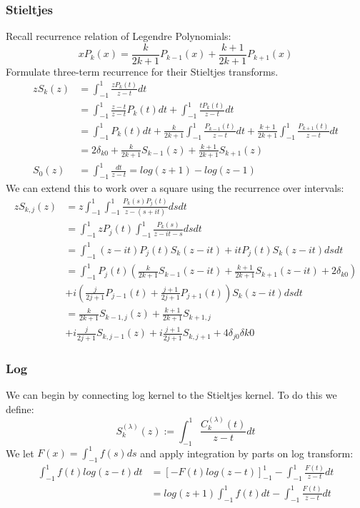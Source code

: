 \documentclass{article}
\begin{document}
\subsubsection*{Stieltjes}
Recall recurrence relation of Legendre Polynomials:
\begin{equation}\label{legendre recurrence}
	xP_k(x) = \frac{k}{2k+1}P_{k-1}(x) + \frac{k+1}{2k+1}P_{k+1}(x)
\end{equation}
Formulate three-term recurrence for their Stieltjes transforms.
\begin{equation}
\begin{split}
	zS_k(z) &= \int_{-1}^{1}\frac{zP_k(t)}{z-t}dt \\
	&= \int_{-1}^{1}\frac{z-t}{z-t}P_k(t)dt+\int_{-1}^{1}\frac{tP_k(t)}{z-t}dt \\
	&= \int_{-1}^{1}P_k(t)dt+\frac{k}{2k+1}\int_{-1}^{1}\frac{P_{k-1}(t)}{z-t}dt+\frac{k+1}{2k+1}\int_{-1}^{1}\frac{P_{k+1}(t)}{z-t}dt \\
	&= 2\delta_{k0}+\frac{k}{2k+1}S_{k-1}(z)+\frac{k+1}{2k+1}S_{k+1}(z) \\
	S_0(z) &= \int_{-1}^{1}\frac{dt}{z-t} = log(z+1)-log(z-1)
\end{split}
\end{equation}
We can extend this to work over a square using the recurrence over intervals:
\begin{equation}
\begin{split}
zS_{k,j}(z) &= z\int_{-1}^1\int_{-1}^1\frac{P_k(s)P_j(t)}{z-(s+it)}dsdt \\
&= \int_{-1}^1zP_j(t)\int_{-1}^1\frac{P_k(s)}{z-it-s}dsdt \\
&= \int_{-1}^1(z-it)P_j(t)S_k(z-it)+itP_j(t)S_k(z-it)dsdt \\
&= \int_{-1}^1P_j(t)(\frac{k}{2k+1}S_{k-1}(z-it)+\frac{k+1}{2k+1}S_{k+1}(z-it)+2\delta_{k0}) \\
&+i(\frac{j}{2j+1}P_{j-1}(t)+\frac{j+1}{2j+1}P_{j+1}(t))S_k(z-it)dsdt \\
&= \frac{k}{2k+1}S_{k-1,j}(z)+\frac{k+1}{2k+1}S_{k+1,j} \\
&+i\frac{j}{2j+1}S_{k,j-1}(z)+i\frac{j+1}{2j+1}S_{k,j+1}+4\delta_{j0}\delta{k0}
\end{split}
\end{equation}
\subsubsection*{Log}
We can begin by connecting log kernel to the Stieltjes kernel. To do this we define:$$S_k^{(\lambda)}(z):=\int_{-1}^{1}\frac{C_k^{(\lambda)}(t)}{z-t}dt$$
We let $F(x) = \int_{-1}^1f(s)ds$ and apply integration by parts on log transform:
\begin{equation}
\begin{split}
	\int_{-1}^1f(t)log(z-t)dt &= [-F(t)log(z-t)]_{-1}^1-\int_{-1}^1\frac{F(t)}{z-t}dt \\
	&= log(z+1)\int_{-1}^1f(t)dt-\int_{-1}^1\frac{F(t)}{z-t}dt
\end{split}
\end{equation}
\end{document}
